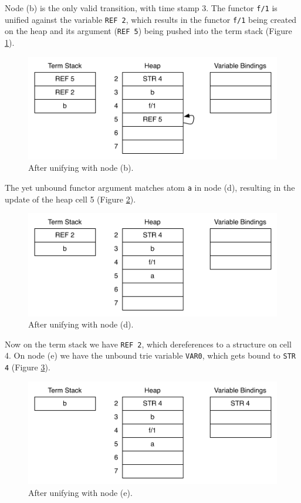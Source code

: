 Node (b) is the only valid transition, with time stamp 3.
The functor \texttt{f/1} is unified against the variable \texttt{REF 2},
which results in the functor \texttt{f/1} being created on the heap
and its argument (\texttt{REF 5}) being pushed into the term stack
(Figure \ref{fig:collect_variable2}).

\begin{figure}[H]
  \centering
    \includegraphics[scale=0.6]{collect_variable2.pdf}
  \caption{After unifying with node (b).}
  \label{fig:collect_variable2}
\end{figure}

The yet unbound functor argument matches atom \texttt{a} in node (d),
resulting in the update of the heap cell 5 (Figure \ref{fig:collect_variable3}).

\begin{figure}[H]
  \centering
    \includegraphics[scale=0.6]{collect_variable3.pdf}
  \caption{After unifying with node (d).}
  \label{fig:collect_variable3}
\end{figure}

Now on the term stack we have \texttt{REF 2}, which dereferences to
a structure on cell 4. On node (e) we have the unbound trie variable
\texttt{VAR0}, which gets bound to \texttt{STR 4} (Figure \ref{fig:collect_variable4}).

\begin{figure}[H]
  \centering
    \includegraphics[scale=0.6]{collect_variable4.pdf}
  \caption{After unifying with node (e).}
  \label{fig:collect_variable4}
\end{figure}


